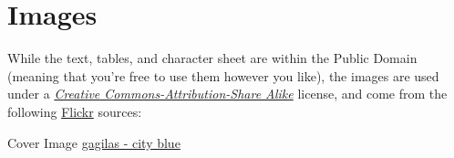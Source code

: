 \documentclass[12pt,oneside,onecolumn,openany,final]{memoir}
\begin{document}

\clearpage{}

\clearpage{}

\clearpage{}

\clearpage{}

\clearpage{}

\clearpage{}

\clearpage{}

\clearpage{}

\clearpage{}

\clearpage{}

\clearpage{}

\clearpage{}

\clearpage{}

\clearpage{}

{}
\chapter*{Images}

\hspace{\parindent} While the text, tables, and character sheet are within the Public Domain (meaning that you're free to use them however you like), the images are used under a \textit{\href{http://creativecommons.org/licenses/by-sa/2.0/}{Creative Commons-Attribution-Share Alike}} license, and come from the following \href{http://www.flickr.com/}{Flickr} sources:

\begin{description*}
\item[Cover Image] \href{http://www.flickr.com/photos/gagilas/3564331018}{gagilas - city blue}
\end{description*}

\clearpage
{}
\listoftables

\clearpage
{}
\printindex

\clearpage
{}
{}

\end{document}
